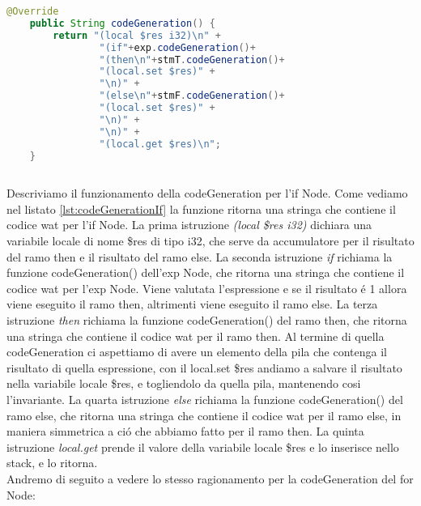 \documentclass[../../main.tex]{subfiles}
\begin{document}
\begin{lstlisting}[language=Java, caption={codeGeneration() per l'if Node}, label={lst:codeGenerationIf}]
    @Override
    public String codeGeneration() {
        return "(local $res i32)\n" +
                "(if"+exp.codeGeneration()+
                "(then\n"+stmT.codeGeneration()+
                "(local.set $res)" +
                "\n)" +
                "(else\n"+stmF.codeGeneration()+
                "(local.set $res)" +
                "\n)" +
                "\n)" +
                "(local.get $res)\n";
    }
    
\end{lstlisting}
Descriviamo il funzionamento della codeGeneration per l'if Node. Come vediamo nel listato \ref{lst:codeGenerationIf} la funzione ritorna una stringa che contiene il codice wat per l'if Node.
La prima istruzione \textit{(local \$res i32)} dichiara una variabile locale di nome \$res di tipo i32, che serve da accumulatore per il risultato del ramo then e il risultato del ramo else.
La seconda istruzione \textit{if} richiama la funzione codeGeneration() dell'exp Node, che ritorna una stringa che contiene il codice wat per l'exp Node.
Viene valutata l'espressione e se il risultato é 1 allora viene eseguito il ramo then, altrimenti viene eseguito il ramo else.
La terza istruzione \textit{then} richiama la funzione codeGeneration() del ramo then, che ritorna una stringa che contiene il codice wat per il ramo then.
Al termine di quella codeGeneration ci aspettiamo di avere un elemento della pila che contenga il risultato di quella espressione, con il local.set \$res andiamo a salvare il risultato nella variabile locale \$res, e togliendolo da quella pila, mantenendo cosi l'invariante.
La quarta istruzione \textit{else} richiama la funzione codeGeneration() del ramo else, che ritorna una stringa che contiene il codice wat per il ramo else, in maniera simmetrica a ció che abbiamo fatto per il ramo then.
La quinta istruzione \textit{local.get} prende il valore della variabile locale \$res e lo inserisce nello stack, e lo ritorna.\\

Andremo di seguito a vedere lo stesso ragionamento per la codeGeneration del for Node:
    
\end{document}
